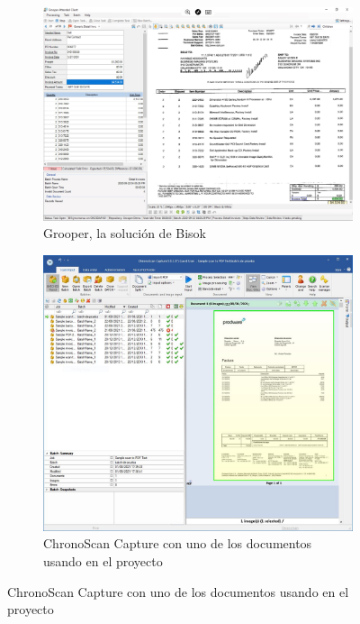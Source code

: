 \begin{figure}
    \centering
    \begin{subfigure}[b]{0.9\textwidth}
        \centering
        \includegraphics[width=\textwidth]{imaxes/b-estado-arte/bisok-grooper}
        \caption{Grooper, la solución de Bisok}
        \label{fig:grooper-bisok}
    \end{subfigure}
    \begin{subfigure}[b]{0.8\textwidth}
        \centering
        \includegraphics[width=\textwidth]{imaxes/b-estado-arte/chronoscan-capture}
        \caption{ChronoScan Capture con uno de los documentos usando en el proyecto}
        \label{fig:chronoscan-capture}
    \end{subfigure}
\end{figure}
